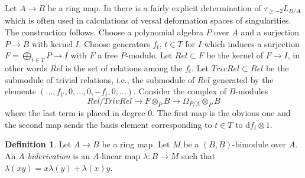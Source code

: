 \documentclass[10pt,a4paper]{amsart}
\theoremstyle{plain}
\theoremstyle{definition}
\newtheorem{definition}[subsection]{Definition}
\theoremstyle{remark}
\numberwithin{equation}{subsection}
\begin{document}
\noindent
Let $A \to B$ be a ring map. In \cite{Lichtenbaum-Schlessinger}
there is a fairly explicit determination of $\tau_{\geq -2}L_{B/A}$
which is often used in calculations of versal deformation spaces of
singularities. The construction follows.
Choose a polynomial algebra $P$ over $A$
and a surjection $P \to B$ with kernel $I$. Choose generators
$f_t$, $t \in T$ for $I$ which induces a surjection
$F = \bigoplus_{t \in T} P \to I$ with $F$ a free $P$-module.
Let $Rel \subset F$ be the kernel of $F \to I$, in other words
$Rel$ is the set of relations among the $f_t$. Let $TrivRel \subset Rel$
be the submodule of trivial relations, i.e., the submodule of $Rel$
generated by the elements $(\ldots, f_{t'}, 0, \ldots, 0, -f_t, 0, \ldots)$.
Consider the complex of $B$-modules
\begin{equation}
\label{equation-lichtenbaum-schlessinger}
Rel/TrivRel \longrightarrow
F \otimes_P B \longrightarrow
\Omega_{P/A} \otimes_P B
\end{equation}
where the last term is placed in degree $0$. The first map is the obvious
one and the second map sends the basis element corresponding to $t \in T$
to $\text{d}f_t \otimes 1$.

\begin{definition}
\label{definition-biderivation}
Let $A \to B$ be a ring map. Let $M$ be a $(B, B)$-bimodule
over $A$. An {\it $A$-biderivation} is an $A$-linear map $\lambda : B \to M$
such that $\lambda(xy) = x\lambda(y) + \lambda(x)y$.
\end{definition}
\end{document}
